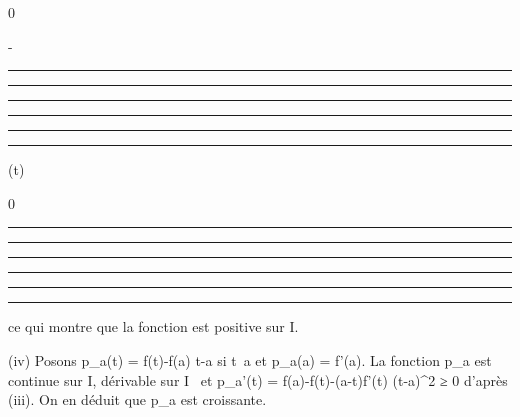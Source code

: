 \documentclass[]{article}
\begin{document}
0

-

\begin{center}\rule{3in}{0.4pt}\end{center}

\begin{center}\rule{3in}{0.4pt}\end{center}

\begin{center}\rule{3in}{0.4pt}\end{center}

\begin{center}\rule{3in}{0.4pt}\end{center}

\begin{center}\rule{3in}{0.4pt}\end{center}

\begin{center}\rule{3in}{0.4pt}\end{center}

\phi(t)

\searrow

0

\nearrow

\begin{center}\rule{3in}{0.4pt}\end{center}

\begin{center}\rule{3in}{0.4pt}\end{center}

\begin{center}\rule{3in}{0.4pt}\end{center}

\begin{center}\rule{3in}{0.4pt}\end{center}

\begin{center}\rule{3in}{0.4pt}\end{center}

\begin{center}\rule{3in}{0.4pt}\end{center}

ce qui montre que la fonction \phi est positive sur I.

(iv) Posons p\_a(t) = f(t)-f(a) \over t-a si
t\neq~a et p\_a(a) = f'(a). La fonction
p\_a est continue sur I, dérivable sur I
\diagdown\a\ et p\_a'(t) =
f(a)-f(t)-(a-t)f'(t) \over (t-a)^2 ≥ 0
d'après (iii). On en déduit que p\_a est croissante.
\end{document}
